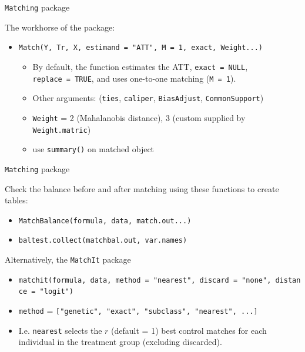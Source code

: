 \documentclass[ignorenonframetext,]{beamer}
\begin{document}
\begin{frame}[fragile]{\texttt{Matching} package}

The workhorse of the package:

\begin{itemize}
\item
  \texttt{Match(Y,\ Tr,\ X,\ estimand\ =\ "ATT",\ M\ =\ 1,\ exact,\ Weight...)}

  \begin{itemize}
  \item
    By default, the function estimates the ATT, \texttt{exact\ =\ NULL},
    \texttt{replace\ =\ TRUE}, and uses one-to-one matching
    (\texttt{M\ =\ 1}).
  \item
    Other arguments: (\texttt{ties}, \texttt{caliper},
    \texttt{BiasAdjust}, \texttt{CommonSupport})
  \item
    \texttt{Weight} = 2 (Mahalanobis distance), 3 (custom supplied by
    \texttt{Weight.matric})
  \item
    use \texttt{summary()} on matched object
  \end{itemize}
\end{itemize}

\end{frame}

\begin{frame}[fragile]{\texttt{Matching} package}

Check the balance before and after matching using these functions to
create tables:

\begin{itemize}
\item
  \texttt{MatchBalance(formula,\ data,\ match.out...)}
\item
  \texttt{baltest.collect(matchbal.out,\ var.names)}
\end{itemize}

\end{frame}

\begin{frame}[fragile]{Alternatively, the \texttt{MatchIt} package}

\begin{itemize}
\item
  \texttt{matchit(formula,\ data,\ method\ =\ "nearest",\ discard\ =\ "none",\ distance\ =\ "logit")}
\item
  \texttt{method} =
  \texttt{{[}"genetic",\ "exact",\ "subclass",\ "nearest",\ ...{]}}
\item
  I.e. \texttt{nearest} selects the \(r\) (default = 1) best control
  matches for each individual in the treatment group (excluding
  discarded).
\end{itemize}

\end{frame}
\end{document}
